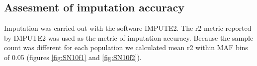 \subsection{Assesment of imputation accuracy}
Imputation was carried out with the software IMPUTE2. The r2 metric reported by IMPUTE2 was used as the metric of imputation accuracy. Because the sample count was different for each population we calculated mean \gls{r2} within \gls{MAF} bins of 0.05 (figures \ref{fig:SN10f1} and \ref{fig:SN10f2}).